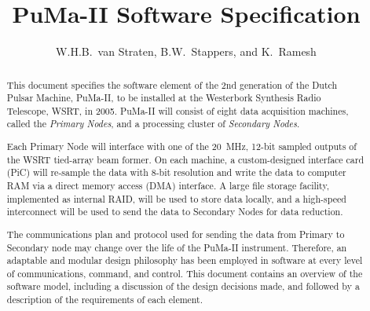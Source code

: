 \documentclass{scrreprt}
\begin{document}
\title{PuMa-II Software Specification}

\author{W.H.B.\ van Straten, B.W.\ Stappers, and K.\ Ramesh}

\maketitle
\tableofcontents{}

\begin{abstract}
This document specifies the software element of the 2nd generation of
the Dutch Pulsar Machine, PuMa-II, to be installed at the Westerbork
Synthesis Radio Telescope, WSRT, in 2005.  PuMa-II will consist of
eight data acquisition machines, called the \emph{Primary Nodes}, and
a processing cluster of \emph{Secondary Nodes}.

Each Primary Node will interface with one of the 20\, MHz, 12-bit
sampled outputs of the WSRT tied-array beam former.  On each machine,
a custom-designed interface card (PiC) will re-sample the data with
8-bit resolution and write the data to computer RAM via a direct
memory access (DMA) interface.  A large file storage facility,
implemented as internal RAID, will be used to store data locally, and
a high-speed interconnect will be used to send the data to Secondary
Nodes for data reduction.

The communications plan and protocol used for sending the data from
Primary to Secondary node may change over the life of the PuMa-II
instrument.  Therefore, an adaptable and modular design philosophy has
been employed in software at every level of communications, command,
and control.  This document contains an overview of the software
model, including a discussion of the design decisions made, and
followed by a description of the requirements of each element.

\end{abstract}








\end{document}
